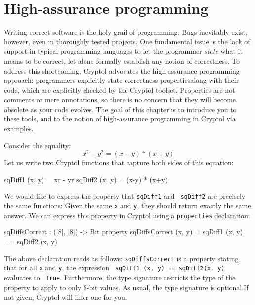 
\chapter{High-assurance programming}
\label{cha:high-assur-progr}

Writing correct software is the holy grail of programming. Bugs
inevitably exist, however, even in thoroughly tested projects.  One
fundamental issue is the lack of support in typical programming
languages to let the programmer \emph{state} what it means to be
correct, let alone formally establish any notion of correctness.  To
address this shortcoming, Cryptol advocates the high-assurance
programming approach: programmers explicitly state correctness
properties\indProperty along with their code, which are explicitly
checked by the Cryptol toolset.  Properties are not comments or mere
annotations, so there is no concern that they will become obsolete as
your code evolves.  The goal of this chapter is to introduce you to
these tools, and to the notion of high-assurance programming in
Cryptol via examples.


Consider the equality:
$$
x^2 - y^2 = (x-y) * (x+y)
$$
Let us write two Cryptol functions that capture both sides of this
equation:\indTimes\indExponentiate\indMinus\indPlus
\begin{code}
  sqDiff1 (x, y) = x^^2  - y^^2
  sqDiff2 (x, y) = (x-y) * (x+y)
\end{code}
We would like to express the property that {\tt sqDiff1} and {\tt
  sqDiff2} are precisely the same functions: Given the same {\tt x}
and {\tt y}, they should return exactly the same answer. We can
express this property in Cryptol using a {\tt properties}
declaration:\indProperty
\begin{code}
  sqDiffsCorrect : ([8], [8]) -> Bit
  property sqDiffsCorrect (x, y) = sqDiff1 (x, y) == sqDiff2 (x, y)
\end{code}
The above declaration reads as follows: {\tt sqDiffsCorrect} is a
property stating that for all {\tt x} and {\tt y}, the expression {\tt
  sqDiff1 (x, y) == sqDiff2(x, y)} evaluates to {\tt
  True}. Furthermore, the type signature restricts the type of the
property to apply to only 8-bit values. As usual, the type signature
is optional.\indSignature If not given, Cryptol will infer one for
you.

